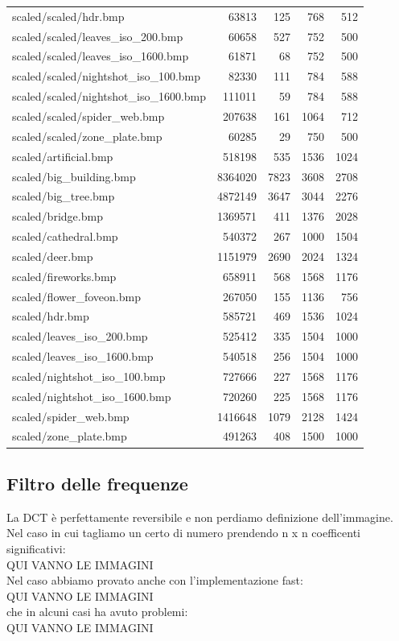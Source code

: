 \documentclass[12pt]{article}
\begin{document}
\begin{table}[!h]
\begin{tabular}{|l|r|r|r|r|}
scaled/scaled/hdr.bmp & 63813 & 125 & 768 & 512 \\ 
scaled/scaled/leaves\_iso\_200.bmp & 60658 & 527 & 752 & 500 \\ 
scaled/scaled/leaves\_iso\_1600.bmp & 61871 & 68 & 752 & 500 \\ 
scaled/scaled/nightshot\_iso\_100.bmp & 82330 & 111 & 784 & 588 \\ 
scaled/scaled/nightshot\_iso\_1600.bmp & 111011 & 59 & 784 & 588 \\ 
scaled/scaled/spider\_web.bmp & 207638 & 161 & 1064 & 712 \\ 
scaled/scaled/zone\_plate.bmp & 60285 & 29 & 750 & 500 \\ 
scaled/artificial.bmp & 518198 & 535 & 1536 & 1024 \\ 
scaled/big\_building.bmp & 8364020 & 7823 & 3608 & 2708 \\ 
scaled/big\_tree.bmp & 4872149 & 3647 & 3044 & 2276 \\ 
scaled/bridge.bmp & 1369571 & 411 & 1376 & 2028 \\ 
scaled/cathedral.bmp & 540372 & 267 & 1000 & 1504 \\ 
scaled/deer.bmp & 1151979 & 2690 & 2024 & 1324 \\ 
scaled/fireworks.bmp & 658911 & 568 & 1568 & 1176 \\ 
scaled/flower\_foveon.bmp & 267050 & 155 & 1136 & 756 \\ 
scaled/hdr.bmp & 585721 & 469 & 1536 & 1024 \\ 
scaled/leaves\_iso\_200.bmp & 525412 & 335 & 1504 & 1000 \\ 
scaled/leaves\_iso\_1600.bmp & 540518 & 256 & 1504 & 1000 \\ 
scaled/nightshot\_iso\_100.bmp & 727666 & 227 & 1568 & 1176 \\ 
scaled/nightshot\_iso\_1600.bmp & 720260 & 225 & 1568 & 1176 \\ 
scaled/spider\_web.bmp & 1416648 & 1079 & 2128 & 1424 \\ 
scaled/zone\_plate.bmp & 491263 & 408 & 1500 & 1000 \\
\hline
\end{tabular}
\end{table}

\subsection{Filtro delle frequenze}
La DCT \`e perfettamente reversibile e non perdiamo definizione dell'immagine. Nel caso in cui tagliamo un certo di numero prendendo n x n coefficenti significativi: \\
QUI VANNO LE IMMAGINI \\
Nel caso abbiamo provato anche con l'implementazione fast: \\
QUI VANNO LE IMMAGINI \\
che in alcuni casi ha avuto problemi: \\
QUI VANNO LE IMMAGINI \\
\end{document}
